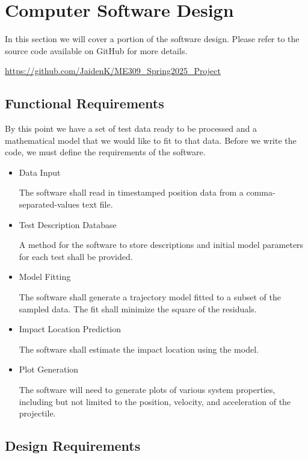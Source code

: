 \section{Computer Software Design}
In this section we will cover a portion of the software design. Please refer to the source code available on GitHub for more details. 

\href{https://github.com/JaidenK/ME309\_Spring2025\_Project}{https://github.com/JaidenK/ME309\_Spring2025\_Project}

\subsection{Functional Requirements}
By this point we have a set of test data ready to be processed and a mathematical model that we would like to fit to that data. Before we write the code, we must define the requirements of the software. 

\begin{itemize}

\item Data Input

The software shall read in timestamped position data from a comma-separated-values text file. 

\item Test Description Database 

A method for the software to store descriptions and initial model parameters for each test shall be provided. 

\item Model Fitting

The software shall generate a trajectory model fitted to a subset of the sampled data. The fit shall minimize the square of the residuals.

\item Impact Location Prediction

The software shall estimate the impact location using the model. 

\item Plot Generation

The software will need to generate plots of various system properties, including but not limited to the position, velocity, and acceleration of the projectile. 

\end{itemize}

\subsection{Design Requirements}

